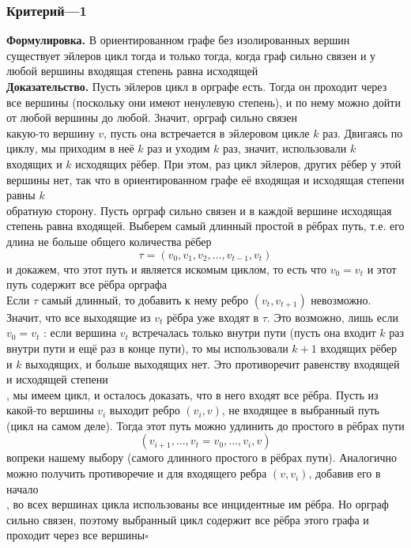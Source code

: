 \documentclass[a4paper]{article}
\newcommand{\qed}{\hfill$\square$}
\begin{document}
\subsubsection*{Критерий—1}
\textbf{Формулировка.} В ориентированном графе без изолированных вершин существует эйлеров цикл тогда и только тогда, когда граф сильно связен и у любой вершины входящая степень равна исходящей\\[2mm]
\indent\textbf{Доказательство.} Пусть эйлеров цикл в орграфе есть. Тогда он проходит через все вершины (поскольку они имеют ненулевую степень), и по нему можно дойти от любой вершины до любой. Значит, орграф сильно связен\\[2mm]
 какую-то вершину $v$, пусть она встречается в эйлеровом цикле $k$ раз. Двигаясь по циклу, мы приходим в неё $k$ раз и уходим $k$ раз, значит, использовали $k$ входящих и $k$ исходящих рёбер. При этом, раз цикл эйлеров, других рёбер у этой вершины нет, так что в ориентированном графе её входящая и исходящая степени равны $k$\\[2mm]
 обратную сторону. Пусть орграф сильно связен и в каждой вершине исходящая степень равна входящей. Выберем самый длинный простой в рёбрах путь, т.е. его длина не больше общего количества рёбер
$$\tau=\left(v_0, v_1, v_2, \ldots, v_{t-1}, v_t\right)$$
и докажем, что этот путь и является искомым циклом, то есть что $v_0=v_t$ и этот путь содержит все рёбра орграфа\\[2mm]
\indent Если $\tau$ самый длинный, то добавить к нему ребро $\left(v_t, v_{t+1}\right)$ невозможно. Значит, что все выходящие из $v_t$ рёбра уже входят в $\tau$. Это возможно, лишь если $v_0=v_t$ : если вершина $v_t$ встречалась только внутри пути (пусть она входит $k$ раз внутри пути и ещё раз в конце пути), то мы использовали $k+1$ входящих рёбер и $k$ выходящих, и больше выходящих нет. Это противоречит равенству входящей и исходящей степени\\[2mm]
, мы имеем цикл, и осталось доказать, что в него входят все рёбра. Пусть из какой-то вершины $v_i$ выходит ребро $\left(v_i, v\right)$, не входящее в выбранный путь (цикл на самом деле). Тогда этот путь можно удлинить до простого в рёбрах пути
$$\left(v_{i+1}, \ldots, v_t=v_0, \ldots, v_i, v\right)$$
вопреки нашему выбору (самого длинного простого в рёбрах пути). Аналогично можно получить противоречие и для входящего ребра $\left(v, v_i\right)$, добавив его в начало\\[2mm]
, во всех вершинах цикла использованы все инцидентные им рёбра. Но орграф сильно связен, поэтому выбранный цикл содержит все рёбра этого графа и проходит через все вершины\qed
\end{document}
